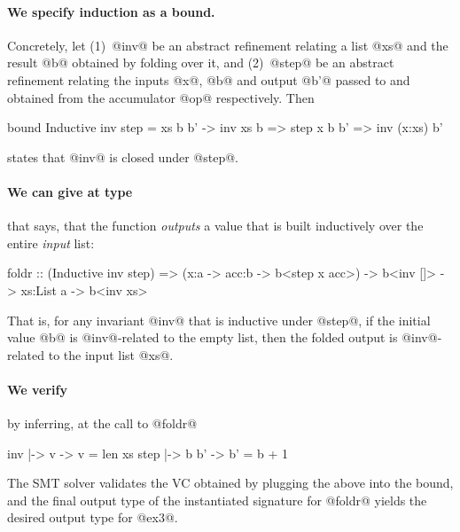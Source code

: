 \paragraph{We specify induction as a bound.} Concretely, let
(1)~@inv@ be an abstract refinement relating a list @xs@ 
    and the result @b@ obtained by folding over it, and
(2)~@step@ be an abstract refinement relating the 
    inputs @x@, @b@ and output @b'@ passed to and 
    obtained from the accumulator @op@ respectively.
%
Then
%
\begin{code}
    bound Inductive inv step = \x xs b b' -> 
      inv xs b => step x b b' => inv (x:xs) b'
\end{code}
%
states that @inv@ is closed under @step@. 

\paragraph{We can give  at type} that says, that the 
function \emph{outputs} a value that is built inductively
over the entire \emph{input} list:
%
\begin{code}
    foldr :: (Inductive inv step) 
          => (x:a -> acc:b -> b<step x acc>)
          -> b<inv []>
          -> xs:List a
          -> b<inv xs>
\end{code}
%
That is, for any invariant @inv@ that is inductive 
under @step@, if the initial value @b@ is @inv@-related
to the empty list, then the folded output is @inv@-related
to the input list @xs@.

\paragraph{We verify } by inferring, at the call to @foldr@
%
\begin{code}
    inv  |-> \xs v   -> v = len xs
    step |-> \x b b' -> b' = b + 1
\end{code}
%
The SMT solver validates the VC obtained by plugging the 
above into the bound, and the final output type of the 
instantiated signature for @foldr@ yields the desired 
output type for @ex3@.

